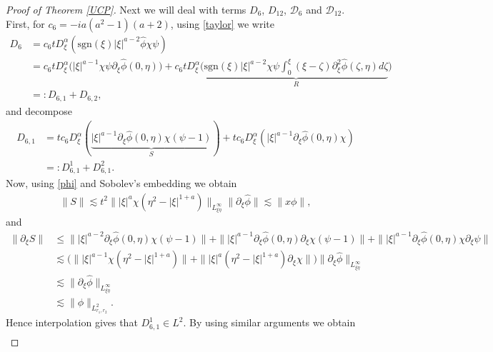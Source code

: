 \documentclass[reqno]{amsart}
\newcommand{\ha}{\hat{\phi}}
\newcommand{\les}{\lesssim}
\newcommand{\La}{\|\phi\|_{L^2_{r_1,r_2}}}
\newcommand{\dt}{D^{\alpha}_\xi}
\newcommand{\p}{\partial}
\newcommand{\sgn}{\text{sgn}}
\numberwithin{equation}{section}
\begin{document}
\begin{proof}[Proof of Theorem \ref{UCP}]
Next we will deal with terms $D_6$, $D_{12}$, $\mathcal{D}_6$ and $\mathcal{D}_{12}$. First, for  $c_6=-ia(a^2-1)(a+2)$, using \eqref{taylor} we write
\begin{equation}
\begin{split}\label{d6}
D_6&=c_6 t\dt(\sgn(\xi)|\xi|^{a-2}\ha \chi \psi)\\
&= c_6 t\dt \Big(|\xi|^{a-1} \chi\psi \p_\xi \ha(0,\eta)\Big)+c_6 t\dt \Big(\underbrace{\sgn(\xi)|\xi|^{a-2}\chi\psi\int_0^\xi (\xi-\zeta)\partial_\xi^2 \hat{\phi}(\zeta,\eta)d\zeta}_{R}\Big)\\
&=:D_{6,1}+D_{6,2},
\end{split}
\end{equation}
and decompose
\begin{equation}
\begin{split}\label{d62}
D_{6,1}&=tc_6 \dt(\underbrace{|\xi|^{a-1}\p_\xi\ha(0,\eta) \chi (\psi-1)}_{S})+tc_6 \dt(|\xi|^{a-1}\p_\xi\ha(0,\eta) \chi) \\
&=:D_{6,1}^1+D_{6,1}^2.
\end{split}
\end{equation}
Now, using \eqref{phi} and Sobolev's embedding we obtain
\begin{equation*}
\begin{split}\label{S}
\|S\|\lesssim t^2\||\xi|^{a} \chi(\eta^2-|\xi|^{1+a})\|_{L^\infty_{\xi\eta}}\|\p_\xi \ha\|
\lesssim \|x\phi\|,
\end{split}
\end{equation*}
and
\begin{equation*}
\begin{split}\label{dS}
\|\p_\xi S\|&\leq\||\xi|^{a-2}\p_\xi \ha(0,\eta)\chi(\psi-1)\|+\||\xi|^{a-1}\p_\xi\ha(0,\eta)\p_\xi\chi(\psi-1)\|+
\||\xi|^{a-1}\p_\xi\ha(0,\eta)\chi\p_\xi\psi\|\\
&\lesssim \Big(\||\xi|^{a-1}\chi(\eta^2-|\xi|^{1+a})\|+\||\xi|^{a}(\eta^2-|\xi|^{1+a})\p_\xi\chi \|\Big)\|\p_\xi \ha\|_{L^\infty_{\xi\eta}}\\
&\lesssim \|\p_\xi \ha\|_{L^\infty_{\xi\eta}}\\
&\les\La.
\end{split}
\end{equation*}
Hence interpolation gives that $D_{6,1}^1\in L^2$. By using similar arguments we obtain
\begin{equation}
\begin{split}\label{R}

\end{split}
\end{equation}
\end{proof}
\end{document}
